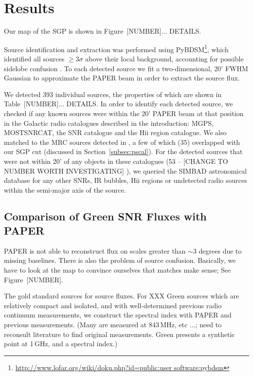 \documentclass[useAMS,usenatbib]{mn2e}
\begin{document}
\section{Results}
\label{sec:res}

Our map of the SGP is shown in Figure~{\color{red}[NUMBER]... DETAILS}.

Source identification and extraction was performed using PyBDSM\footnote{\url{http://www.lofar.org/wiki/doku.php?id=public:user software:pybdsm}}, which identified all sources $\geq3\sigma$ above their local background, accounting for possible sidelobe confusion \citep{PyBDSM.15}. To each detected source we fit a two-dimensional, 20' FWHM Gaussian to approximate the PAPER beam \citep{Parsons.10} in order to extract the source flux. 

We detected $393$ individual sources, the properties of which are shown in Table~{\color{red}[NUMBER]... DETAILS}. In order to identify each detected source, we checked if any known sources were within the 20' PAPER beam at that position in the Galactic radio catalogues described in the introduction: MGPS, MOSTSNRCAT, the \cite{DAGreen.14} SNR catalogue and the \cite{Paladini.03} H{\sc ii} region catalogue. We also matched to the MRC sources detected in \cite{Jacobs.11}, a few of which (35) overlapped with our SGP cut (discussed in Section~\ref{subsec:pscal}). For the detected sources that were not within 20' of any objects in these catalogues (53 -- {\color{red}[CHANGE TO NUMBER WORTH INVESTIGATING]} ), we queried the SIMBAD astronomical database \citep{Wegner.00} for any other SNRs,  IR bubbles, H{\sc ii} regions or undetected radio sources within the semi-major axis of the source.

\subsection{Comparison of Green SNR Fluxes with PAPER}

PAPER is not able to reconstruct flux on scales greater than $\sim3$
degrees due to missing baselines.  There is also the problem of source
confusion.  Basically, we have to look at the map to convince
ourselves that matches make sense; See Figure~{\color{red}[NUMBER]}.

{\color{red} The gold standard sources for source fluxes.}
For XXX Green sources which are relatively compact
and isolated, and with well-determined previous radio continuum
measurements, we construct the spectral index with PAPER and previous
measurements.  (Many are measured at 843\,MHz, etc ...; need to
reconsult literature to find original measurements.  Green presents a
synthetic point at 1\,GHz, and a spectral index.)
\end{document}
